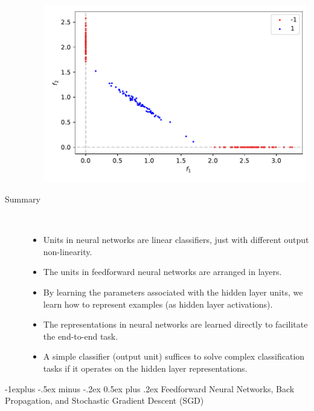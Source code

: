 \documentclass[10pt,landscape,a4paper]{article}
\makeatletter
\renewcommand{\subsection}{\@startsection{subsection}{2}{0mm}%
                                {-1explus -.5ex minus -.2ex}%
                                {0.5ex plus .2ex}%
                                {\normalfont\normalsize\bfseries}}
\makeatother
\begin{document}
\begin{multicols*}{3}
\begin{description}
\begin{itemize}[noitemsep, topsep=0pt]
\begin{center}
			\includegraphics[width=0.6\columnwidth]{relu.pdf}
		\end{center}
	\end{itemize}
	\item[Summary] ~
	\begin{itemize}
		\item Units in neural networks are linear classifiers, just with different output non-linearity.
		\item The units in feedforward neural networks are arranged in layers.
		\item By learning the parameters associated with the hidden layer units, we learn how to represent examples (as hidden layer activations).
		\item The representations in neural networks are learned directly to facilitate the end-to-end task.
		\item A simple classifier (output unit) suffices to solve complex classification tasks if it operates on the hidden layer representations.
	\end{itemize}
\end{description}
\subsection{Feedforward Neural Networks, Back Propagation, and Stochastic Gradient Descent (SGD)}


\end{multicols*}
\end{document}
